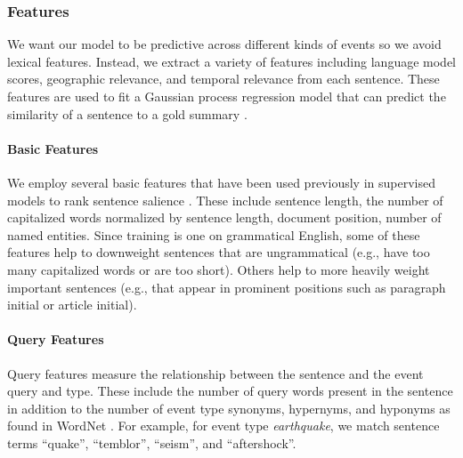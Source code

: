 \subsubsection{Features}
We want our model to be predictive across different kinds of events so we avoid lexical features.  Instead, we extract a variety of features including language model scores, geographic relevance, and temporal relevance from each sentence.  These features are used to fit a Gaussian process regression model that can predict the similarity of a sentence to a gold summary \cite{preotiuc2013temporal}.  

\paragraph{Basic Features}

We employ several basic features that have been used previously in supervised models to rank sentence salience \cite{kupiec1995trainable,conroy2001using}. These include sentence length, the number of capitalized words normalized by sentence length, document position, number of named entities.  
Since training is one on grammatical English, some of these features help
to downweight sentences that are ungrammatical (e.g., have too many capitalized words or are too short).
Others help to more heavily weight important sentences (e.g., that appear in
prominent positions such as paragraph initial or article initial).

\paragraph{Query Features}

Query features measure the relationship between the sentence and the event query and type.  These include the number of query words present in the sentence in addition to the number of event type synonyms, hypernyms, and hyponyms as found in WordNet \cite{miller1995wordnet}.  For example, for event type \emph{earthquake},  we match sentence terms ``quake'', ``temblor'', ``seism'', and ``aftershock''.
